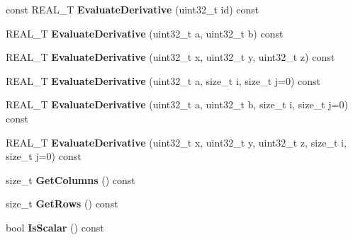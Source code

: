 \begin{DoxyCompactItemize}
\item 
\hypertarget{structatl_1_1_divide_a0002c6a3821c0c667fb3bf8bfef08950}{const R\+E\+A\+L\+\_\+\+T {\bfseries Evaluate\+Derivative} (uint32\+\_\+t id) const }\label{structatl_1_1_divide_a0002c6a3821c0c667fb3bf8bfef08950}

\item 
\hypertarget{structatl_1_1_divide_ab1c0e0d04d00e8670f965bf50c86d92f}{R\+E\+A\+L\+\_\+\+T {\bfseries Evaluate\+Derivative} (uint32\+\_\+t a, uint32\+\_\+t b) const }\label{structatl_1_1_divide_ab1c0e0d04d00e8670f965bf50c86d92f}

\item 
\hypertarget{structatl_1_1_divide_a5cae35f64745a2e85da0f82383fa3b2e}{R\+E\+A\+L\+\_\+\+T {\bfseries Evaluate\+Derivative} (uint32\+\_\+t x, uint32\+\_\+t y, uint32\+\_\+t z) const }\label{structatl_1_1_divide_a5cae35f64745a2e85da0f82383fa3b2e}

\item 
\hypertarget{structatl_1_1_divide_a9bd2507a264c863e668927f4eba54dee}{R\+E\+A\+L\+\_\+\+T {\bfseries Evaluate\+Derivative} (uint32\+\_\+t a, size\+\_\+t i, size\+\_\+t j=0) const }\label{structatl_1_1_divide_a9bd2507a264c863e668927f4eba54dee}

\item 
\hypertarget{structatl_1_1_divide_ac07310b45c6aad8559519ced136beb86}{R\+E\+A\+L\+\_\+\+T {\bfseries Evaluate\+Derivative} (uint32\+\_\+t a, uint32\+\_\+t b, size\+\_\+t i, size\+\_\+t j=0) const }\label{structatl_1_1_divide_ac07310b45c6aad8559519ced136beb86}

\item 
\hypertarget{structatl_1_1_divide_aeffb1c9821da7e2332ae608dac5fed45}{R\+E\+A\+L\+\_\+\+T {\bfseries Evaluate\+Derivative} (uint32\+\_\+t x, uint32\+\_\+t y, uint32\+\_\+t z, size\+\_\+t i, size\+\_\+t j=0) const }\label{structatl_1_1_divide_aeffb1c9821da7e2332ae608dac5fed45}

\item 
\hypertarget{structatl_1_1_divide_ac0021998b955347f6f8adcab6027d271}{size\+\_\+t {\bfseries Get\+Columns} () const }\label{structatl_1_1_divide_ac0021998b955347f6f8adcab6027d271}

\item 
\hypertarget{structatl_1_1_divide_a8c2e57c4a7de5e95ced4953432e69ccf}{size\+\_\+t {\bfseries Get\+Rows} () const }\label{structatl_1_1_divide_a8c2e57c4a7de5e95ced4953432e69ccf}

\item 
\hypertarget{structatl_1_1_divide_a63953552caab4438cebcfee1a202e0f9}{bool {\bfseries Is\+Scalar} () const }\label{structatl_1_1_divide_a63953552caab4438cebcfee1a202e0f9}


\end{DoxyCompactItemize}
